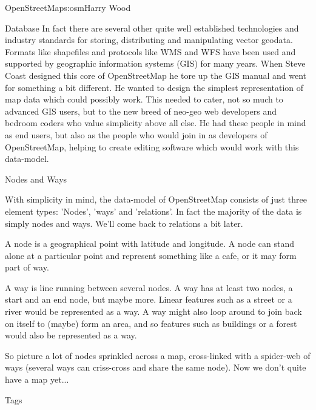 \begin{aosachapter}{OpenStreetMap}{s:osm}{Harry Wood}
\begin{aosasect1}{Database}
In fact there are several other quite well established technologies
and industry standards for storing, distributing and manipulating
vector geodata. Formats like shapefiles and protocols like WMS and WFS
have been used and supported by geographic information systems (GIS)
for many years. When Steve Coast designed this core of OpenStreetMap
he tore up the GIS manual and went for something a bit different. He
wanted to design the simplest representation of map data which could
possibly work. This needed to cater, not so much to advanced GIS
users, but to the new breed of neo-geo web developers and bedroom
coders who value simplicity above all else. He had these people in
mind as end users, but also as the people who would join in as
developers of OpenStreetMap, helping to create editing software which
would work with this data-model.

\begin{aosasect2}{Nodes and Ways}

With simplicity in mind, the data-model of OpenStreetMap consists of
just three element types: 'Nodes', 'ways' and 'relations'. In fact the
majority of the data is simply nodes and ways. We'll come back to
relations a bit later.

\begin{aosaitemize}

\item A node is a geographical point with latitude and longitude. A
  node can stand alone at a particular point and represent something
  like a cafe, or it may form part of way.

\item A way is line running between several nodes. A way has at least
  two nodes, a start and an end node, but maybe more. Linear features
  such as a street or a river would be represented as a way.  A way
  might also loop around to join back on itself to (maybe) form an
  area, and so features such as buildings or a forest would also be
  represented as a way.

\end{aosaitemize}

So picture a lot of nodes sprinkled across a map, cross-linked with a
spider-web of ways (several ways can criss-cross and share the same
node). Now we don't quite have a map yet...

\end{aosasect2}

\begin{aosasect2}{Tags}


\end{aosasect2}
\end{aosasect1}
\end{aosachapter}
